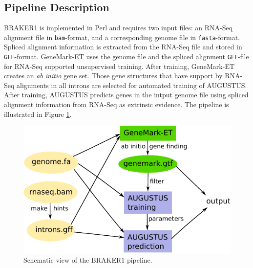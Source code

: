 \documentclass{bioinfo}
\begin{document}
\begin{methods}
\section{Pipeline Description}

BRAKER1 is implemented in Perl and requires two input files: an RNA-Seq alignment file in \texttt{bam}-format, and a corresponding genome file in \texttt{fasta}-format. Spliced alignment information is extracted from the RNA-Seq file and stored in \texttt{GFF}-format. GeneMark-ET uses the genome file and  the spliced alignment \texttt{GFF}-file for RNA-Seq supported unsupervised training. After training, GeneMark-ET creates an \textit{ab initio} gene set. Those gene structures that have support by RNA-Seq alignments in all introns are selected for automated training of AUGUSTUS. After training, AUGUSTUS predicts genes in the intput genome file using spliced alignment information from RNA-Seq as extrinsic evidence. The pipeline is illustrated in Figure \ref{pipeline}.

\begin{figure}[!tpb]%
\centerline{\includegraphics[width=0.9\linewidth]{figs/Figure1.pdf}}
\caption{Schematic view of the BRAKER1 pipeline.}\label{pipeline}
\end{figure}


\end{methods}
\end{document}
